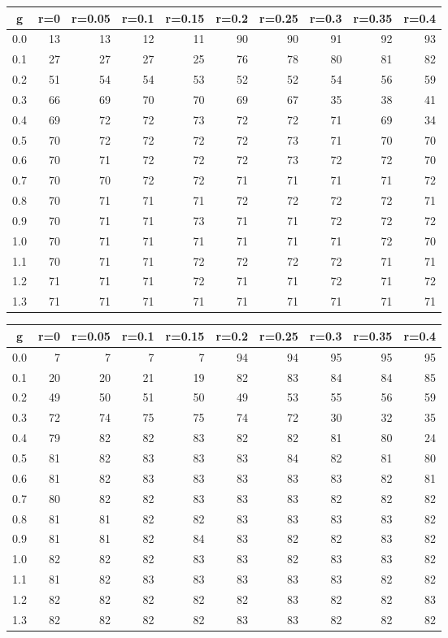 %
\begin{table}[!tbp]
 \begin{center}
 \begin{tabular}{rrrrrrrrrr}\hline\hline
\multicolumn{1}{c}{g}&\multicolumn{1}{c}{r=0}&\multicolumn{1}{c}{r=0.05}&\multicolumn{1}{c}{r=0.1}&\multicolumn{1}{c}{r=0.15}&\multicolumn{1}{c}{r=0.2}&\multicolumn{1}{c}{r=0.25}&\multicolumn{1}{c}{r=0.3}&\multicolumn{1}{c}{r=0.35}&\multicolumn{1}{c}{r=0.4}\tabularnewline
\hline
0.0&13&13&12&11&90&90&91&92&93\tabularnewline
0.1&27&27&27&25&76&78&80&81&82\tabularnewline
0.2&51&54&54&53&52&52&54&56&59\tabularnewline
0.3&66&69&70&70&69&67&35&38&41\tabularnewline
0.4&69&72&72&73&72&72&71&69&34\tabularnewline
0.5&70&72&72&72&72&73&71&70&70\tabularnewline
0.6&70&71&72&72&72&73&72&72&70\tabularnewline
0.7&70&70&72&72&71&71&71&71&72\tabularnewline
0.8&70&71&71&71&72&72&72&72&71\tabularnewline
0.9&70&71&71&73&71&71&72&72&72\tabularnewline
1.0&70&71&71&71&71&71&71&72&70\tabularnewline
1.1&70&71&71&72&72&72&72&71&71\tabularnewline
1.2&71&71&71&72&71&71&72&71&72\tabularnewline
1.3&71&71&71&71&71&71&71&71&71\tabularnewline
\hline
\end{tabular}

\end{center}

\end{table}

%
\begin{table}[!tbp]
 \begin{center}
 \begin{tabular}{rrrrrrrrrr}\hline\hline
\multicolumn{1}{c}{g}&\multicolumn{1}{c}{r=0}&\multicolumn{1}{c}{r=0.05}&\multicolumn{1}{c}{r=0.1}&\multicolumn{1}{c}{r=0.15}&\multicolumn{1}{c}{r=0.2}&\multicolumn{1}{c}{r=0.25}&\multicolumn{1}{c}{r=0.3}&\multicolumn{1}{c}{r=0.35}&\multicolumn{1}{c}{r=0.4}\tabularnewline
\hline
0.0& 7& 7& 7& 7&94&94&95&95&95\tabularnewline
0.1&20&20&21&19&82&83&84&84&85\tabularnewline
0.2&49&50&51&50&49&53&55&56&59\tabularnewline
0.3&72&74&75&75&74&72&30&32&35\tabularnewline
0.4&79&82&82&83&82&82&81&80&24\tabularnewline
0.5&81&82&83&83&83&84&82&81&80\tabularnewline
0.6&81&82&83&83&83&83&83&82&81\tabularnewline
0.7&80&82&82&83&83&83&82&82&82\tabularnewline
0.8&81&81&82&82&83&83&83&83&82\tabularnewline
0.9&81&81&82&84&83&82&82&83&82\tabularnewline
1.0&82&82&82&83&83&82&83&83&82\tabularnewline
1.1&81&82&83&83&83&83&83&82&82\tabularnewline
1.2&82&82&82&82&82&83&82&82&83\tabularnewline
1.3&82&82&82&82&83&83&82&82&82\tabularnewline
\hline
\end{tabular}

\end{center}

\end{table}

